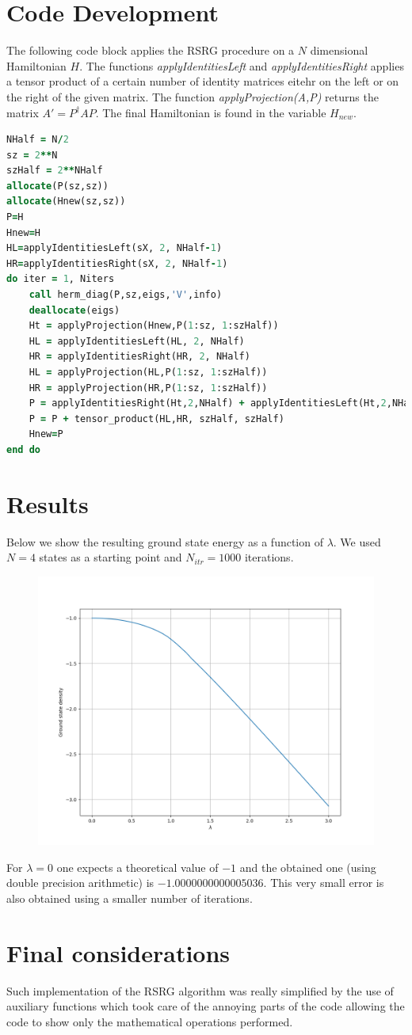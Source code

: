 \documentclass{article}
\begin{document}
\section*{Code Development}
The following code block applies the RSRG procedure on a $N$ dimensional Hamiltonian $H$. The functions \textit{applyIdentitiesLeft} and \textit{applyIdentitiesRight} applies a tensor product of a certain number of identity matrices eitehr on the left or on the right of the given matrix. The function \textit{applyProjection(A,P)} returns the matrix $A'=P^\dagger A P$. The final Hamiltonian is found in the variable $H_{new}$.
\begin{lstlisting}[language=Fortran]
NHalf = N/2
sz = 2**N
szHalf = 2**NHalf
allocate(P(sz,sz))
allocate(Hnew(sz,sz))
P=H
Hnew=H
HL=applyIdentitiesLeft(sX, 2, NHalf-1)
HR=applyIdentitiesRight(sX, 2, NHalf-1)
do iter = 1, Niters
	call herm_diag(P,sz,eigs,'V',info)
	deallocate(eigs)
	Ht = applyProjection(Hnew,P(1:sz, 1:szHalf))
	HL = applyIdentitiesLeft(HL, 2, NHalf)
	HR = applyIdentitiesRight(HR, 2, NHalf)
	HL = applyProjection(HL,P(1:sz, 1:szHalf))
	HR = applyProjection(HR,P(1:sz, 1:szHalf))
	P = applyIdentitiesRight(Ht,2,NHalf) + applyIdentitiesLeft(Ht,2,NHalf)
	P = P + tensor_product(HL,HR, szHalf, szHalf)
	Hnew=P
end do
\end{lstlisting}
\newpage
\section*{Results}
Below we show the resulting ground state energy as a function of $\lambda$. We used $N=4$ states as a starting point and $N_{itr}=1000$ iterations. 
\begin{figure}[h]
	\includegraphics*[width=\linewidth]{gstate.png}
\end{figure}
\newline
For $\lambda=0$ one expects a theoretical value of $-1$ and the obtained one (using double precision arithmetic) is $-1.0000000000005036$. This very small error is also obtained using a smaller number of iterations.

\section*{Final considerations}
Such implementation of the RSRG algorithm was really simplified by the use of auxiliary functions which took care of the annoying parts of the code allowing the code to show only the mathematical operations performed.
\end{document}
